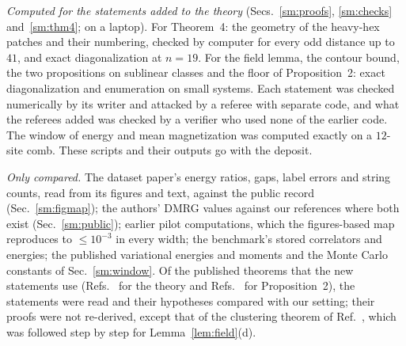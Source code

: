 \documentclass[aps,prx,onecolumn,10pt,nofootinbib,longbibliography,floatfix]{revtex4-2}
\theoremstyle{remark}
\begin{document}
\emph{Computed for the statements added to the theory} (Secs.~\ref{sm:proofs}, \ref{sm:checks} and~\ref{sm:thm4};
on a laptop). For Theorem~4: the geometry of the heavy-hex patches and their numbering, checked by computer for %
every odd distance up to $41$, and exact diagonalization at $n=19$. For the field lemma, the contour bound, the two %
propositions on sublinear classes and the floor of Proposition~2: exact diagonalization and enumeration on small %
systems. Each statement was checked numerically by its writer and attacked by a referee with separate code, and
what the referees added was checked by a verifier who used none of the earlier code. The window of energy and mean
magnetization was computed exactly on a $12$-site comb. These scripts and their outputs go with the deposit. %

\emph{Only compared.} The dataset paper's energy ratios, gaps, label errors and string counts, read from its figures
and text, against the public record (Sec.~\ref{sm:figmap}); the authors' DMRG values against our references where
both exist (Sec.~\ref{sm:public});
earlier pilot computations, which the figures-based map reproduces to $\le10^{-3}$ in every width; the benchmark's stored %
correlators and energies; the published variational energies and moments and the Monte Carlo constants of
Sec.~\ref{sm:window}. Of the published theorems that the new statements use
(Refs.~\cite{nsy2022,nachtergaele2006,koma1994,yarotsky2006} for the theory and
Refs.~\cite{javanmardi2023,cauchois2022,einbinder2022} for Proposition~2), the statements were read and their %
hypotheses compared with our setting; their proofs were not re-derived, except that of the clustering theorem of
Ref.~\cite{nachtergaele2006}, which was followed step by step for Lemma~\ref{lem:field}(d).
\end{document}
